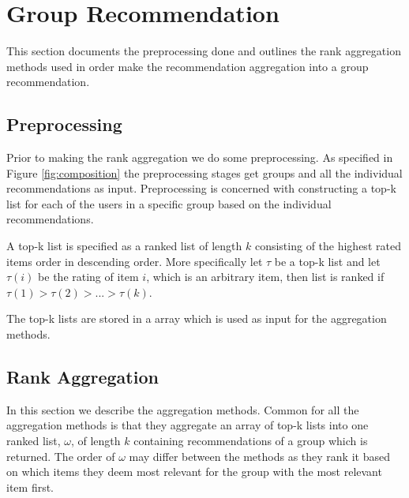 \section{Group Recommendation}\label{sec:grouprecommendation}
This section documents the preprocessing done and outlines the rank aggregation methods used in order make the recommendation aggregation into a group recommendation. 

\subsection{Preprocessing}
Prior to making the rank aggregation we do some preprocessing. As specified in Figure \ref{fig:composition} the preprocessing stages get groups and all the individual recommendations as input. Preprocessing is concerned with constructing a top-k list for each of the users in a specific group based on the individual recommendations.

A top-k list is specified as a ranked list of length $k$ consisting of the highest rated items order in descending order. More specifically let $\tau$ be a top-k list and let $\tau(i)$ be the rating of item $i$, which is an arbitrary item, then list is ranked if $\tau (1) > \tau (2) > ... > \tau (k)$.

The top-k lists are stored in a array which is used as input for the aggregation methods.

\subsection{Rank Aggregation}\label{sec:aggregations}
In this section we describe the aggregation methods. Common for all the aggregation methods is that they aggregate an array of top-k lists into one ranked list, $\omega$, of length $k$ containing recommendations of a group which is returned. The order of $\omega$ may differ between the methods as they rank it based on which items they deem most relevant for the group with the most relevant item first. 




